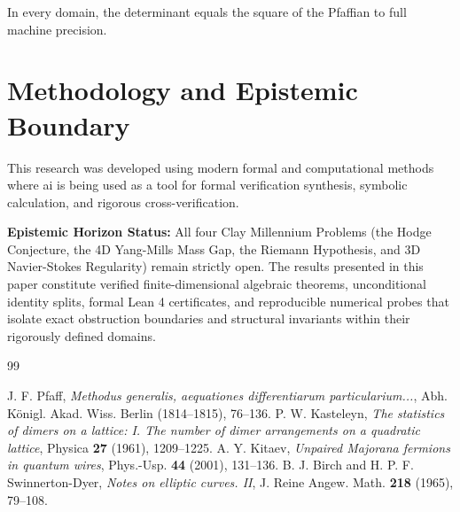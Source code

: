 \documentclass[11pt,a4paper]{article}
\theoremstyle{definition}
\begin{document}
\noindent In every domain, the determinant equals the square of the Pfaffian to full machine precision.


\section{Methodology and Epistemic Boundary}
\noindent This research was developed using modern formal and computational methods where ai is being used as a tool for formal verification synthesis, symbolic calculation, and rigorous cross-verification.

\vspace{0.5em}
\noindent\textbf{Epistemic Horizon Status:} All four Clay Millennium Problems (the Hodge Conjecture, the 4D Yang-Mills Mass Gap, the Riemann Hypothesis, and 3D Navier-Stokes Regularity) remain strictly open. The results presented in this paper constitute verified finite-dimensional algebraic theorems, unconditional identity splits, formal Lean 4 certificates, and reproducible numerical probes that isolate exact obstruction boundaries and structural invariants within their rigorously defined domains.

\begin{thebibliography}{99}

 J. F. Pfaff, \emph{Methodus generalis, aequationes differentiarum particularium...}, Abh. K\"onigl. Akad. Wiss. Berlin (1814--1815), 76--136.
 P. W. Kasteleyn, \emph{The statistics of dimers on a lattice: I. The number of dimer arrangements on a quadratic lattice}, Physica \textbf{27} (1961), 1209--1225.
 A. Y. Kitaev, \emph{Unpaired Majorana fermions in quantum wires}, Phys.-Usp. \textbf{44} (2001), 131--136.
 B. J. Birch and H. P. F. Swinnerton-Dyer, \emph{Notes on elliptic curves. II}, J. Reine Angew. Math. \textbf{218} (1965), 79--108.

\end{thebibliography}
\end{document}

